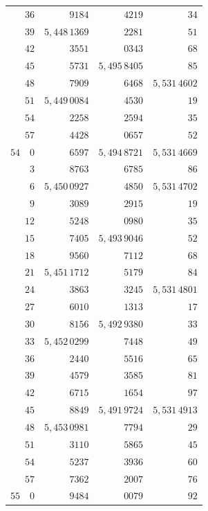 \begin{center}
\begin{tabular}[t]{|r|r|r|r|}
\(36\)&\(9184\)&\(4219\)&\(34\)\\
\(39\)&\(5{,}448\,1369\)&\(2281\)&\(51\)\\
\(42\)&\(3551\)&\(0343\)&\(68\)\\
\(45\)&\(5731\)&\(5{,}495\,8405\)&\(85\)\\
\hline
\(48\)&\(7909\)&\(6468\)&\(5{,}531\,4602\)\\
\(51\)&\(5{,}449\,0084\)&\(4530\)&\(19\)\\
\(54\)&\(2258\)&\(2594\)&\(35\)\\
\(57\)&\(4428\)&\(0657\)&\(52\)\\
\(54\quad0\)&\(6597\)&\(5{,}494\,8721\)&\(5{,}531\,4669\)\\
\hline
\(3\)&\(8763\)&\(6785\)&\(86\)\\
\(6\)&\(5{,}450\,0927\)&\(4850\)&\(5{,}531\,4702\)\\
\(9\)&\(3089\)&\(2915\)&\(19\)\\
\(12\)&\(5248\)&\(0980\)&\(35\)\\
\(15\)&\(7405\)&\(5{,}493\,9046\)&\(52\)\\
\hline
\(18\)&\(9560\)&\(7112\)&\(68\)\\
\(21\)&\(5{,}451\,1712\)&\(5179\)&\(84\)\\
\(24\)&\(3863\)&\(3245\)&\(5{,}531\,4801\)\\
\(27\)&\(6010\)&\(1313\)&\(17\)\\
\(30\)&\(8156\)&\(5{,}492\,9380\)&\(33\)\\
\hline
\(33\)&\(5{,}452\,0299\)&\(7448\)&\(49\)\\
\(36\)&\(2440\)&\(5516\)&\(65\)\\
\(39\)&\(4579\)&\(3585\)&\(81\)\\
\(42\)&\(6715\)&\(1654\)&\(97\)\\
\(45\)&\(8849\)&\(5{,}491\,9724\)&\(5{,}531\,4913\)\\
\hline
\(48\)&\(5{,}453\,0981\)&\(7794\)&\(29\)\\
\(51\)&\(3110\)&\(5865\)&\(45\)\\
\(54\)&\(5237\)&\(3936\)&\(60\)\\
\(57\)&\(7362\)&\(2007\)&\(76\)\\
\(55\quad0\)&\(9484\)&\(0079\)&\(92\)\\
\hline\end{tabular}
\endgroup
\end{center}

